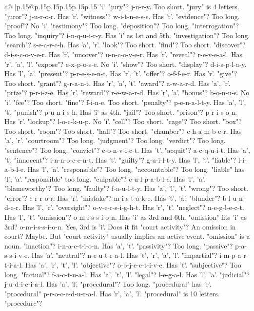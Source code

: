 \documentclass{article}
\begin{document}
{\begin{supertabular}{c@{$\;$}|p{.15\linewidth}@{}p{.15\linewidth}p{.15\linewidth}p{.15\linewidth}p{.15\linewidth}p{.15\linewidth}}
{{{'i'. "jury"? j{-}u{-}r{-}y. Too short. "jury" is 4 letters. "juror"? j{-}u{-}r{-}o{-}r. Has 'r'. "witness"? w{-}i{-}t{-}n{-}e{-}s{-}s. Has 't'. "evidence"? Too long. "proof"? No 'i'. "testimony"? Too long. "deposition"? Too long. "interrogation"? Too long. "inquiry"? i{-}n{-}q{-}u{-}i{-}r{-}y. Has 'i' as 1st and 5th. "investigation"? Too long. "search"? s{-}e{-}a{-}r{-}c{-}h. Has 'a', 'r'. "look"? Too short. "find"? Too short. "discover"? d{-}i{-}s{-}c{-}o{-}v{-}e{-}r. Has 'r'. "uncover"? u{-}n{-}c{-}o{-}v{-}e{-}r. Has 'r'. "reveal"? r{-}e{-}v{-}e{-}a{-}l. Has 'r', 'a', 'l'. "expose"? e{-}x{-}p{-}o{-}s{-}e. No 'i'. "show"? Too short. "display"? d{-}i{-}s{-}p{-}l{-}a{-}y. Has 'l', 'a'. "present"? p{-}r{-}e{-}s{-}e{-}n{-}t. Has 'r', 't'. "offer"? o{-}f{-}f{-}e{-}r. Has 'r'. "give"? Too short. "grant"? g{-}r{-}a{-}n{-}t. Has 'r', 'a', 't'. "award"? a{-}w{-}a{-}r{-}d. Has 'a', 'r'. "prize"? p{-}r{-}i{-}z{-}e. Has 'r'. "reward"? r{-}e{-}w{-}a{-}r{-}d. Has 'r', 'a'. "bonus"? b{-}o{-}n{-}u{-}s. No 'i'. "fee"? Too short. "fine"? f{-}i{-}n{-}e. Too short. "penalty"? p{-}e{-}n{-}a{-}l{-}t{-}y. Has 'a', 'l', 't'. "punish"? p{-}u{-}n{-}i{-}s{-}h. Has 'i' as 4th. "jail"? Too short. "prison"? p{-}r{-}i{-}s{-}o{-}n. Has 'r'. "lockup"? l{-}o{-}c{-}k{-}u{-}p. No 'i'. "cell"? Too short. "cage"? Too short. "box"? Too short. "room"? Too short. "hall"? Too short. "chamber"? c{-}h{-}a{-}m{-}b{-}e{-}r. Has 'a', 'r'. "courtroom"? Too long. "judgment"? Too long. "verdict"? Too long. "sentence"? Too long. "convict"? c{-}o{-}n{-}v{-}i{-}c{-}t. Has 't'. "acquit"? a{-}c{-}q{-}u{-}i{-}t. Has 'a', 't'. "innocent"? i{-}n{-}n{-}o{-}c{-}e{-}n{-}t. Has 't'. "guilty"? g{-}u{-}i{-}l{-}t{-}y. Has 'l', 't'. "liable"? l{-}i{-}a{-}b{-}l{-}e. Has 'l', 'a'. "responsible"? Too long. "accountable"? Too long. "liable" has 'l', 'a'. "responsible" too long. "culpable"? c{-}u{-}l{-}p{-}a{-}b{-}l{-}e. Has 'l', 'a'. "blameworthy"? Too long. "faulty"? f{-}a{-}u{-}l{-}t{-}y. Has 'a', 'l', 't'. "wrong"? Too short. "error"? e{-}r{-}r{-}o{-}r. Has 'r'. "mistake"? m{-}i{-}s{-}t{-}a{-}k{-}e. Has 't', 'a'. "blunder"? b{-}l{-}u{-}n{-}d{-}e{-}r. Has 'l', 'r'. "oversight"? o{-}v{-}e{-}r{-}s{-}i{-}g{-}h{-}t. Has 'r', 't'. "neglect"? n{-}e{-}g{-}l{-}e{-}c{-}t. Has 'l', 't'. "omission"? o{-}m{-}i{-}s{-}s{-}i{-}o{-}n. Has 'i' as 3rd and 6th. "omission" fits 'i' as 3rd? o{-}m{-}i{-}s{-}s{-}i{-}o{-}n. Yes, 3rd is 'i'. Does it fit "court activity"? An omission in court? Maybe. But "court activity" usually implies an active event. "omission" is a noun. "inaction"? i{-}n{-}a{-}c{-}t{-}i{-}o{-}n. Has 'a', 't'. "passivity"? Too long. "passive"? p{-}a{-}s{-}s{-}i{-}v{-}e. Has 'a'. "neutral"? n{-}e{-}u{-}t{-}r{-}a{-}l. Has 't', 'r', 'a', 'l'. "impartial"? i{-}m{-}p{-}a{-}r{-}t{-}i{-}a{-}l. Has 'a', 'r', 't', 'l'. "objective"? o{-}b{-}j{-}e{-}c{-}t{-}i{-}v{-}e. Has 't'. "subjective"? Too long. "factual"? f{-}a{-}c{-}t{-}u{-}a{-}l. Has 'a', 't', 'l'. "legal"? l{-}e{-}g{-}a{-}l. Has 'l', 'a'. "judicial"? j{-}u{-}d{-}i{-}c{-}i{-}a{-}l. Has 'a', 'l'. "procedural"? Too long. "procedural" has 'r'. "procedural" p{-}r{-}o{-}c{-}e{-}d{-}u{-}r{-}a{-}l. Has 'r', 'a', 'l'. "procedural" is 10 letters. "procedure"? }}}
\end{supertabular}}
\end{document}
